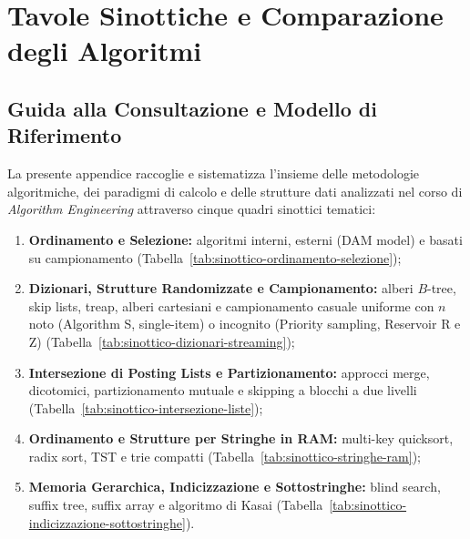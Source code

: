 \chapter{Tavole Sinottiche e Comparazione degli Algoritmi}
\label{ch:appendice-quadro-sinottico-algoritmi}

\FloatBarrier
\section{Guida alla Consultazione e Modello di Riferimento}
\label{sec:guida-consultazione-sinottico}

La presente appendice raccoglie e sistematizza l'insieme delle metodologie algoritmiche, dei paradigmi di calcolo e delle strutture dati analizzati nel corso di \textit{Algorithm Engineering} attraverso cinque quadri sinottici tematici:
\begin{enumerate}
  \item \textbf{Ordinamento e Selezione:} algoritmi interni, esterni (DAM model) e basati su campionamento (Tabella~\ref{tab:sinottico-ordinamento-selezione});
  \item \textbf{Dizionari, Strutture Randomizzate e Campionamento:} alberi $B$-tree, skip lists, treap, alberi cartesiani e campionamento casuale uniforme con $n$ noto (Algorithm S, single-item) o incognito (Priority sampling, Reservoir R e Z) (Tabella~\ref{tab:sinottico-dizionari-streaming});
  \item \textbf{Intersezione di Posting Lists e Partizionamento:} approcci merge, dicotomici, partizionamento mutuale e skipping a blocchi a due livelli (Tabella~\ref{tab:sinottico-intersezione-liste});
  \item \textbf{Ordinamento e Strutture per Stringhe in RAM:} multi-key quicksort, radix sort, TST e trie compatti (Tabella~\ref{tab:sinottico-stringhe-ram});
  \item \textbf{Memoria Gerarchica, Indicizzazione e Sottostringhe:} blind search, suffix tree, suffix array e algoritmo di Kasai (Tabella~\ref{tab:sinottico-indicizzazione-sottostringhe}).
\end{enumerate} 

